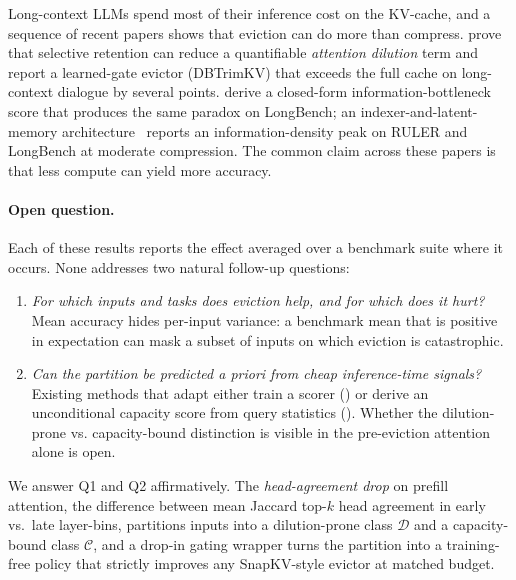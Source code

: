 \documentclass{article}
\begin{document}
Long-context LLMs spend most of their inference cost on the KV-cache, and a
sequence of recent papers shows that eviction can do more than compress.
\citet{arxiv260509649} prove that selective retention can reduce a quantifiable
\emph{attention dilution} term and report a learned-gate evictor (DBTrimKV) that
exceeds the full cache on long-context dialogue by several points.
\citet{arxiv260425975} derive a closed-form
information-bottleneck score that produces the same paradox on LongBench; an
indexer-and-latent-memory architecture~\citep{arxiv260525475}
reports an information-density peak on RULER and LongBench at moderate compression.
The common claim across these papers is that less compute can yield more accuracy.

\paragraph{Open question.} Each of these results reports the effect averaged over
a benchmark suite where it occurs. None addresses two natural follow-up questions:
\begin{enumerate}
  \item[(Q1)] \emph{For which inputs and tasks does eviction help, and for which
  does it hurt?} Mean accuracy hides per-input variance: a benchmark mean that is
  positive in expectation can mask a subset of inputs on which eviction is
  catastrophic.
  \item[(Q2)] \emph{Can the partition be predicted a priori from cheap inference-time
  signals?} Existing methods that adapt either train a scorer (\citealp{arxiv260509649,arxiv260525475,arxiv260203203,arxiv260210238})
  or derive an unconditional capacity score from query statistics
  (\citealp{arxiv260425975}). Whether the dilution-prone vs.
  capacity-bound distinction is visible in the pre-eviction attention alone is open.
\end{enumerate}

We answer Q1 and Q2 affirmatively. The \emph{head-agreement drop} on
prefill attention, the difference between mean Jaccard top-$k$ head
agreement in early vs.\ late layer-bins, partitions inputs into a
dilution-prone class $\mathcal{D}$ and a capacity-bound class
$\mathcal{C}$, and a drop-in gating wrapper turns the partition into a
training-free policy that strictly improves any SnapKV-style evictor at
matched budget.
\end{document}
